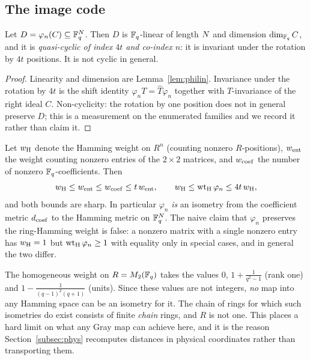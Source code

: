 \subsection{The image code}

\begin{proposition}\label{prop:qc}
Let $D=\varphi_n(C)\subseteq\mathbb F_q^{N}$. Then $D$ is $\mathbb F_q$-linear of length
$N$ and dimension $\dim_{\mathbb F_q}C$, and it is \emph{quasi-cyclic of index
$4t$ and co-index $n$}: it is invariant under the rotation by $4t$
positions. It is not cyclic in general.
\end{proposition}

\begin{proof}
Linearity and dimension are Lemma~\ref{lem:philin}. Invariance under the
rotation by $4t$ is the shift identity $\varphi_nT=\widehat T\varphi_n$
together with $T$-invariance of the right ideal $C$. Non-cyclicity: the
rotation by one position does not in general preserve $D$; this is a
measurement on the enumerated families and we record it rather than claim it.
\end{proof}

\begin{remark}\label{rem:weights}
Let $w_{\rm H}$ denote the Hamming weight on $R^n$ (counting nonzero
$R$-positions), $w_{\rm ent}$ the weight counting nonzero entries of the
$2\times2$ matrices, and $w_{\rm coef}$ the number of nonzero $\mathbb F_q$-coefficients.
Then
\[
  w_{\rm H}\le w_{\rm ent}\le w_{\rm coef}\le t\,w_{\rm ent},
  \qquad
  w_{\rm H}\le\operatorname{wt}_{\rm H}\varphi_n\le 4t\,w_{\rm H},
\]
and both bounds are sharp. In particular $\varphi_n$ \emph{is} an isometry from
the coefficient metric $d_{\rm coef}$ to the Hamming metric on
$\mathbb F_q^{N}$. The naive claim that $\varphi_n$ preserves the ring-Hamming
weight is false: a nonzero matrix with a single nonzero entry has
$w_{\rm H}=1$ but $\operatorname{wt}_{\rm H}\varphi_n\ge1$ with equality only in special
cases, and in general the two differ.
\end{remark}

\begin{remark}\label{rem:noisometry}
The homogeneous weight on $R=M_2(\mathbb F_q)$ takes the values $0$,
$1+\frac1{q^2-1}$ (rank one) and $1-\frac1{(q-1)^2(q+1)}$ (units). Since these
values are not integers, \emph{no} map into any Hamming space can be an isometry
for it. The chain of rings for which such isometries do exist
\cite{GreferathSchmidt1999GrayIsometry} consists of finite \emph{chain} rings,
and $R$ is not one. This places a hard limit on what any Gray map can achieve
here, and it is the reason Section~\ref{subsec:phys} recomputes distances in
physical coordinates rather than transporting them.
\end{remark}

